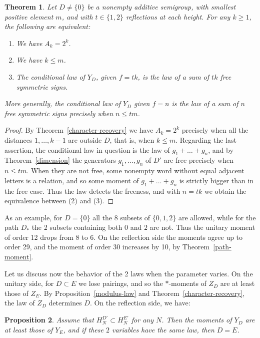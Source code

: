 \documentclass[11pt,a4paper]{article}
\newtheorem{thm}{Theorem}[section]
\newtheorem{prop}[thm]{Proposition}
\begin{document}
\begin{thm}\label{free-character-range}
Let $D\neq\{0\}$ be a nonempty additive semigroup, with smallest positive element $m$, and with $t\in\{1,2\}$ reflections at each height. For any $k\geq1$, the following are equivalent:
\begin{enumerate}
\item We have $A_k=2^k$.

\item We have $k\leq m$.

\item The conditional law of $Y_D$, given $f=tk$, is the law of a sum of $tk$ free symmetric signs.
\end{enumerate}
More generally, the conditional law of $Y_D$ given $f=n$ is the law of a sum of $n$ free symmetric signs precisely when $n\leq tm$.
\end{thm}

\begin{proof}
By Theorem~\ref{character-recovery} we have $A_k=2^k$ precisely when all the distances $1,\ldots,k-1$ are outside $D$, that is, when $k\leq m$. Regarding the last assertion, the conditional law in question is the law of $g_1+\ldots+g_n$, and by Theorem~\ref{dimension} the generators $g_1,\ldots,g_n$ of $D'$ are free precisely when $n\leq tm$. When they are not free, some nonempty word without equal adjacent letters is a relation, and so some moment of $g_1+\ldots+g_n$ is strictly bigger than in the free case. Thus the law detects the freeness, and with $n=tk$ we obtain the equivalence between (2) and (3).
\end{proof}

As an example, for $D=\{0\}$ all the 8 subsets of $\{0,1,2\}$ are allowed, while for the path $D_*$ the 2 subsets containing both $0$ and $2$ are not. Thus the unitary moment of order 12 drops from $8$ to $6$. On the reflection side the moments agree up to order 29, and the moment of order 30 increases by 10, by Theorem~\ref{path-moment}.

Let us discuss now the behavior of the 2 laws when the parameter varies. On the unitary side, for $D\subset E$ we lose pairings, and so the $*$-moments of $Z_D$ are at least those of $Z_E$. By Proposition~\ref{modulus-law} and Theorem~\ref{character-recovery}, the law of $Z_D$ determines $D$. On the reflection side, we have:

\begin{prop}\label{monotone}
Assume that $H_N^{D'}\subset H_N^{E'}$ for any $N$. Then the moments of $Y_D$ are at least those of $Y_E$, and if these $2$ variables have the same law, then $D=E$.
\end{prop}
\end{document}
